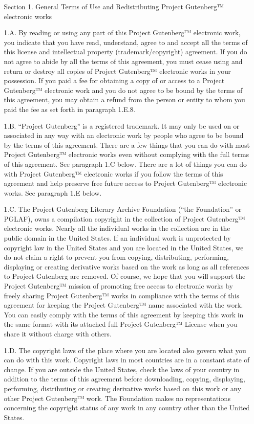 Section 1. General Terms of Use and Redistributing Project Gutenberg™
electronic works

1.A. By reading or using any part of this Project Gutenberg™
electronic work, you indicate that you have read, understand, agree to
and accept all the terms of this license and intellectual property
(trademark/copyright) agreement. If you do not agree to abide by all
the terms of this agreement, you must cease using and return or
destroy all copies of Project Gutenberg™ electronic works in your
possession. If you paid a fee for obtaining a copy of or access to a
Project Gutenberg™ electronic work and you do not agree to be bound
by the terms of this agreement, you may obtain a refund from the person
or entity to whom you paid the fee as set forth in paragraph 1.E.8.

1.B. “Project Gutenberg” is a registered trademark. It may only be
used on or associated in any way with an electronic work by people who
agree to be bound by the terms of this agreement. There are a few
things that you can do with most Project Gutenberg™ electronic works
even without complying with the full terms of this agreement. See
paragraph 1.C below. There are a lot of things you can do with Project
Gutenberg™ electronic works if you follow the terms of this
agreement and help preserve free future access to Project Gutenberg™
electronic works. See paragraph 1.E below.

1.C. The Project Gutenberg Literary Archive Foundation (“the
Foundation” or PGLAF), owns a compilation copyright in the collection
of Project Gutenberg™ electronic works. Nearly all the individual
works in the collection are in the public domain in the United
States. If an individual work is unprotected by copyright law in the
United States and you are located in the United States, we do not
claim a right to prevent you from copying, distributing, performing,
displaying or creating derivative works based on the work as long as
all references to Project Gutenberg are removed. Of course, we hope
that you will support the Project Gutenberg™ mission of promoting
free access to electronic works by freely sharing Project Gutenberg™
works in compliance with the terms of this agreement for keeping the
Project Gutenberg™ name associated with the work. You can easily
comply with the terms of this agreement by keeping this work in the
same format with its attached full Project Gutenberg™ License when
you share it without charge with others.

1.D. The copyright laws of the place where you are located also govern
what you can do with this work. Copyright laws in most countries are
in a constant state of change. If you are outside the United States,
check the laws of your country in addition to the terms of this
agreement before downloading, copying, displaying, performing,
distributing or creating derivative works based on this work or any
other Project Gutenberg™ work. The Foundation makes no
representations concerning the copyright status of any work in any
country other than the United States.

